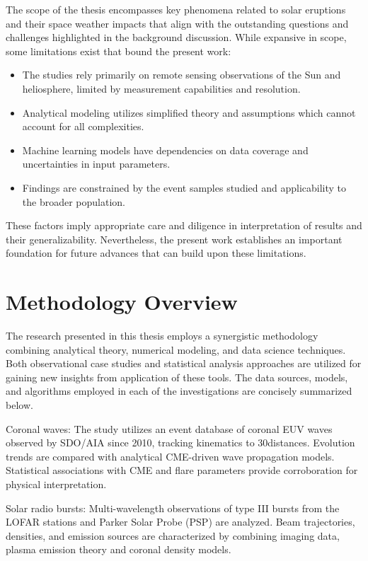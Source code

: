 The scope of the thesis encompasses key phenomena related to solar eruptions and their space weather impacts that align with the outstanding questions and challenges highlighted in the background discussion. While expansive in scope, some limitations exist that bound the present work:

\begin{itemize}
    \item The studies rely primarily on remote sensing observations of the Sun and heliosphere, limited by measurement capabilities and resolution.
    \item Analytical modeling utilizes simplified theory and assumptions which cannot account for all complexities.
    \item Machine learning models have dependencies on data coverage and uncertainties in input parameters.
    \item Findings are constrained by the event samples studied and applicability to the broader population.
\end{itemize}

These factors imply appropriate care and diligence in interpretation of results and their generalizability. Nevertheless, the present work establishes an important foundation for future advances that can build upon these limitations.

\section{Methodology Overview}
The research presented in this thesis employs a synergistic methodology combining analytical theory, numerical modeling, and data science techniques. Both observational case studies and statistical analysis approaches are utilized for gaining new insights from application of these tools. The data sources, models, and algorithms employed in each of the investigations are concisely summarized below.

Coronal waves: The study utilizes an event database of  coronal EUV waves observed by SDO/AIA since 2010, tracking kinematics to 30\rsun distances. Evolution trends are compared with analytical CME-driven wave propagation models. Statistical associations with CME and flare parameters provide corroboration for physical interpretation.

Solar radio bursts: Multi-wavelength observations of type III bursts from the LOFAR stations and Parker Solar Probe (PSP) are analyzed. Beam trajectories, densities, and emission sources are characterized by combining imaging data, plasma emission theory and coronal density models.

